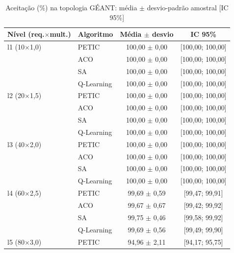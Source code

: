 \begin{table}[htb]
    \centering
    \small
    \caption{Aceitação (\%) na topologia GÉANT: média $\pm$ desvio-padrão amostral [IC 95\%]}
    \label{tab:aceitacao-geant}
    \begin{tabular}{llcc}
        \hline
        Nível (req.$\times$mult.) & Algoritmo & Média $\pm$ desvio & IC 95\% \\
        \hline
        l1 (10$\times$1,0) & PETIC & 100,00 $\pm$ 0,00 & [100,00; 100,00] \\
         & ACO & 100,00 $\pm$ 0,00 & [100,00; 100,00] \\
         & SA & 100,00 $\pm$ 0,00 & [100,00; 100,00] \\
         & Q-Learning & 100,00 $\pm$ 0,00 & [100,00; 100,00] \\
        \hline
        l2 (20$\times$1,5) & PETIC & 100,00 $\pm$ 0,00 & [100,00; 100,00] \\
         & ACO & 100,00 $\pm$ 0,00 & [100,00; 100,00] \\
         & SA & 100,00 $\pm$ 0,00 & [100,00; 100,00] \\
         & Q-Learning & 100,00 $\pm$ 0,00 & [100,00; 100,00] \\
        \hline
        l3 (40$\times$2,0) & PETIC & 100,00 $\pm$ 0,00 & [100,00; 100,00] \\
         & ACO & 100,00 $\pm$ 0,00 & [100,00; 100,00] \\
         & SA & 100,00 $\pm$ 0,00 & [100,00; 100,00] \\
         & Q-Learning & 100,00 $\pm$ 0,00 & [100,00; 100,00] \\
        \hline
        l4 (60$\times$2,5) & PETIC & 99,69 $\pm$ 0,59 & [99,47; 99,91] \\
         & ACO & 99,67 $\pm$ 0,67 & [99,42; 99,92] \\
         & SA & 99,75 $\pm$ 0,46 & [99,58; 99,92] \\
         & Q-Learning & 99,69 $\pm$ 0,56 & [99,49; 99,90] \\
        \hline
        l5 (80$\times$3,0) & PETIC & 94,96 $\pm$ 2,11 & [94,17; 95,75] \\

\end{tabular}
\end{table}
